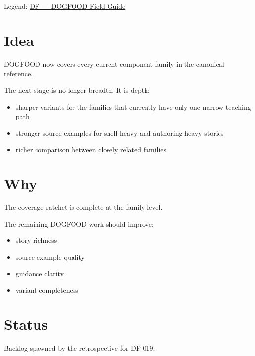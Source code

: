Legend: \href{https://github.com/flyingrobots/bijou/blob/1853ad902f6bf219326409e7f743a5a1d6517dbc/docs/method/legends/DF-dogfood-field-guide.md}{DF --- DOGFOOD Field Guide}

\section{Idea}\label{record-292-idea}

DOGFOOD now covers every current component family in the canonical reference.

The next stage is no longer breadth. It is depth:

\begin{itemize}
\tightlist
\item
  sharper variants for the families that currently have only one narrow teaching path
\item
  stronger source examples for shell-heavy and authoring-heavy stories
\item
  richer comparison between closely related families
\end{itemize}

\section{Why}\label{record-292-why}

The coverage ratchet is complete at the family level.

The remaining DOGFOOD work should improve:

\begin{itemize}
\tightlist
\item
  story richness
\item
  source-example quality
\item
  guidance clarity
\item
  variant completeness
\end{itemize}

\section{Status}\label{record-292-status}

Backlog spawned by the retrospective for DF-019.

